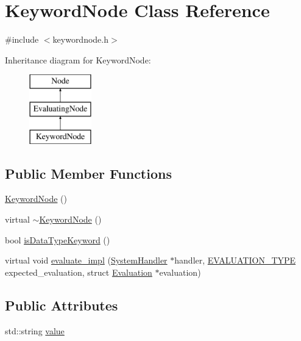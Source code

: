 \hypertarget{classKeywordNode}{}\section{Keyword\+Node Class Reference}
\label{classKeywordNode}


{\ttfamily \#include $<$keywordnode.\+h$>$}

Inheritance diagram for Keyword\+Node\+:\begin{figure}[H]
\begin{center}
\leavevmode
\includegraphics[height=3.000000cm]{classKeywordNode}
\end{center}
\end{figure}
\subsection*{Public Member Functions}
\begin{DoxyCompactItemize}
\item 
\hyperlink{classKeywordNode_ab060b7ee55f027750ad1643036845bc9}{Keyword\+Node} ()
\item 
virtual \hyperlink{classKeywordNode_aecea61e123e74d669b42d009a8dacade}{$\sim$\+Keyword\+Node} ()
\item 
bool \hyperlink{classKeywordNode_a89ea6cb927bd569214b97ba0dff1ebec}{is\+Data\+Type\+Keyword} ()
\item 
virtual void \hyperlink{classKeywordNode_a699f7171c8415901b1a501f72933cfdf}{evaluate\+\_\+impl} (\hyperlink{classSystemHandler}{System\+Handler} $\ast$handler, \hyperlink{statics_8h_a6664c451ca7787483a7981cc1de68dbb}{E\+V\+A\+L\+U\+A\+T\+I\+O\+N\+\_\+\+T\+Y\+PE} expected\+\_\+evaluation, struct \hyperlink{structEvaluation}{Evaluation} $\ast$evaluation)
\end{DoxyCompactItemize}
\subsection*{Public Attributes}
\begin{DoxyCompactItemize}
\item 
std\+::string \hyperlink{classKeywordNode_aa70b672a2e216e214c595ee196f225ae}{value}
\end{DoxyCompactItemize}
